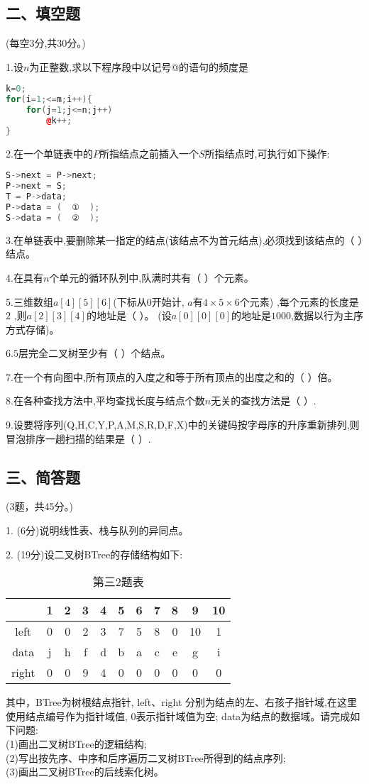 \subsection{二、填空题}
(每空3分,共30分。)

1.设$n$为正整数,求以下程序段中以记号@的语句的频度是 \\
\begin{lstlisting}[language=cpp]
k=0;
for(i=1;<=m;i++){
    for(j=1;j<=n;j++)
        @k++;
}
\end{lstlisting}

2.在一个单链表中的$P$所指结点之前插入一个$S$所指结点时,可执行如下操作:  \\
\begin{lstlisting}[language=cpp]
S->next = P->next;
P->next = S;
T = P->data;
P->data = (  ①  );
S->data = (  ②  );
\end{lstlisting}

3.在单链表中,要删除某一指定的结点(该结点不为首元结点),必须找到该结点的（    ）结点。

4.在具有$n$个单元的循环队列中,队满时共有（    ）个元素。

5.三维数组$a[4][5][6]$(下标从$0$开始计, $a$有$4\times5\times6$个元素) ,每个元素的长度是$2$ ,则$a[2][3][4]$的地址是（    ）。 (设$a[0][0][0]$的地址是$1000$,数据以行为主序方式存储)。

6.$5$层完全二叉树至少有（    ）个结点。

7.在一个有向图中,所有顶点的入度之和等于所有顶点的出度之和的（    ）倍。

8.在各种查找方法中,平均查找长度与结点个数$n$无关的查找方法是（    ）.

9.设要将序列(Q,H,C,Y,P,A,M,S,R,D,F,X)中的关键码按字母序的升序重新排列,则冒泡排序一趟扫描的结果是（    ）.

\subsection{三、简答题}
(3题，共45分。)

1. (6分)说明线性表、栈与队列的异同点。

2. (19分)设二叉树BTree的存储结构如下:
\begin{table}[ht]
\centering
\caption{第三2题表}\label{tab_ZSDS11_1}
\begin{tabular}{|c|c|c|c|c|c|c|c|c|c|c|}
\hline
 & 1 & 2 & 3 & 4 & 5 & 6 & 7 & 8 & 9 & 10 \\
\hline
left & 0 & 0 & 2 & 3 & 7 & 5 & 8 & 0 & 10 & 1 \\
\hline
data & j & h & f & d & b & a & c & e & g & i \\
\hline
right & 0 & 0 & 9 & 4 & 0 & 0 & 0 & 0 & 0 & 0 \\
\hline
\end{tabular}
\end{table}
其中，BTree为树根结点指针, left、right 分别为结点的左、右孩子指针域,在这里使用结点编号作为指针域值, 0表示指针域值为空; data为结点的数据域。请完成如下问题: \\
(1)画出二叉树BTree的逻辑结构; \\
(2)写出按先序、中序和后序遍历二叉树BTree所得到的结点序列; \\
(3)画出二叉树BTree的后线索化树。

